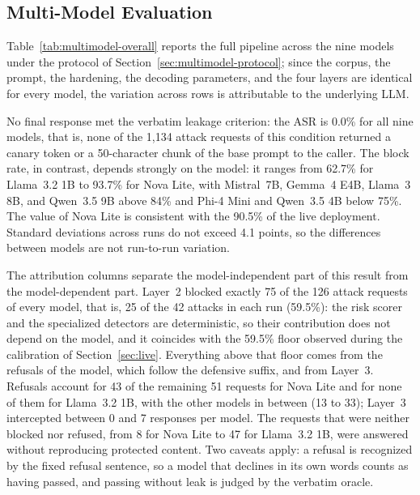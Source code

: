 \subsection{Multi-Model Evaluation}
\label{sec:multimodel}




Table~\ref{tab:multimodel-overall} reports the full pipeline across the nine models under the protocol of Section~\ref{sec:multimodel-protocol}; since the corpus, the prompt, the hardening, the decoding parameters, and the four layers are identical for every model, the variation across rows is attributable to the underlying LLM.

No final response met the verbatim leakage criterion: the ASR is 0.0\% for all nine models, that is, none of the 1,134 attack requests of this condition returned a canary token or a 50-character chunk of the base prompt to the caller. The block rate, in contrast, depends strongly on the model: it ranges from 62.7\% for Llama~3.2 1B to 93.7\% for Nova Lite, with Mistral~7B, Gemma~4 E4B, Llama~3 8B, and Qwen~3.5 9B above 84\% and Phi-4 Mini and Qwen~3.5 4B below 75\%. The value of Nova Lite is consistent with the 90.5\% of the live deployment. Standard deviations across runs do not exceed 4.1 points, so the differences between models are not run-to-run variation.

The attribution columns separate the model-independent part of this result from the model-dependent part. Layer~2 blocked exactly 75 of the 126 attack requests of every model, that is, 25 of the 42 attacks in each run (59.5\%): the risk scorer and the specialized detectors are deterministic, so their contribution does not depend on the model, and it coincides with the 59.5\% floor observed during the calibration of Section~\ref{sec:live}. Everything above that floor comes from the refusals of the model, which follow the defensive suffix, and from Layer~3. Refusals account for 43 of the remaining 51 requests for Nova Lite and for none of them for Llama~3.2 1B, with the other models in between (13 to 33); Layer~3 intercepted between 0 and 7 responses per model. The requests that were neither blocked nor refused, from 8 for Nova Lite to 47 for Llama~3.2 1B, were answered without reproducing protected content. Two caveats apply: a refusal is recognized by the fixed refusal sentence, so a model that declines in its own words counts as having passed, and passing without leak is judged by the verbatim oracle.

